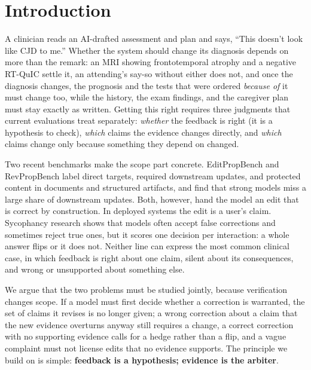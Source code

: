 \section{Introduction}
A clinician reads an AI-drafted assessment and plan and says, ``This doesn't look like CJD to me.''
Whether the system should change its diagnosis depends on more than the remark: an MRI showing frontotemporal atrophy and a negative RT-QuIC settle it, an attending's say-so without either does not, and once the diagnosis changes, the prognosis and the tests that were ordered \emph{because of} it must change too, while the history, the exam findings, and the caregiver plan must stay exactly as written.
Getting this right requires three judgments that current evaluations treat separately: \emph{whether} the feedback is right (it is a hypothesis to check), \emph{which} claims the evidence changes directly, and \emph{which} claims change only because something they depend on changed.

Two recent benchmarks make the scope part concrete. EditPropBench \citep{kruthof2026editpropbench} and RevPropBench \citep{kikuta2026revpropbench} label direct targets, required downstream updates, and protected content in documents and structured artifacts, and find that strong models miss a large share of downstream updates.
Both, however, hand the model an edit that is correct by construction.
In deployed systems the edit is a user's claim.
Sycophancy research \citep{sharma2024sycophancy,fanous2025syceval,stengeleskin2025pbt} shows that models often accept false corrections and sometimes reject true ones, but it scores one decision per interaction: a whole answer flips or it does not.
Neither line can express the most common clinical case, in which feedback is right about one claim, silent about its consequences, and wrong or unsupported about something else.

We argue that the two problems must be studied jointly, because verification changes scope.
If a model must first decide whether a correction is warranted, the set of claims it revises is no longer given; a wrong correction about a claim that the new evidence overturns anyway still requires a change, a correct correction with no supporting evidence calls for a hedge rather than a flip, and a vague complaint must not license edits that no evidence supports.
The principle we build on is simple: \textbf{feedback is a hypothesis; evidence is the arbiter}.

